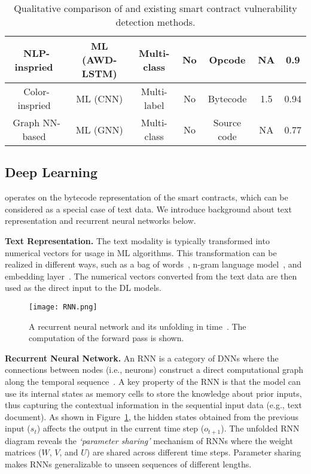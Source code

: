 \begin{table*}
{\begin{tabular}{|c|c|c|c|c|c|c|}
\hline
NLP-inspried~\cite{gogineni2020multi} & ML (AWD-LSTM) & Multi-class & No & Opcode & NA & 0.9 \\ 
\hline
Color-inspried~\cite{huang2018hunting} & ML (CNN) & Multi-label & No & Bytecode & 1.5 & 0.94 \\ 
\hline
Graph NN-based~\cite{zhuangsmart} & ML (GNN) & Multi-class & No & Source code & NA & 0.77 \\
\hline
\end{tabular}
}
\vspace{0.3em}
\caption{Qualitative comparison of \sys{} and existing smart contract vulnerability detection methods. \label{tab:comparison}}
\vspace{-1em}
\end{table*}

\vspace{-0.3em}
\subsection{Deep Learning}
\label{sec:dl}
\vspace{-0.2em}
\sys{} operates on the bytecode representation of the smart contracts, which can be considered as a special case of text data. 
We introduce background about text representation and recurrent neural networks below.

\vspace{0.1em}
\textbf{Text Representation.} 
The text modality is typically transformed into numerical vectors for usage in 
ML algorithms. 
This transformation can be realized in different ways, such as a bag of words~\cite{wallach2006topic}, n-gram language model~\cite{brown1992class}, and embedding layer~\cite{zamani2017relevance}.
The numerical vectors converted from the text data are then used as the direct input to the DL models. 

\setlength{\belowcaptionskip}{-10pt}
\begin{figure}[t!]
  \centering
  \texttt{[image: RNN.png]}
   \vspace{-0.7em}
  \caption{A recurrent neural network and its unfolding in time~\cite{deep-learning-background-03}. The computation of the forward pass is shown.}
  \label{fig:rnn}
  \vspace{-0.3em}
\end{figure}
\vspace{0.1em}
\textbf{Recurrent Neural Network.}
An RNN is a category of DNNs where the connections between nodes (i.e., neurons) construct a direct computational graph along the temporal sequence~\cite{kim2017residual}. 
A key property of the RNN is that the model can use its internal states as memory cells to store the knowledge about prior inputs, thus capturing the contextual information in the sequential input data (e.g., text document).  
As shown in Figure~\ref{fig:rnn}, the hidden states obtained from the previous input ($s_t$) affects the output in the current time step ($o_{t+1}$). The unfolded RNN diagram reveals the \textit{`parameter sharing'} mechanism of RNNs where the weight matrices ($W$, $V$, and $U$) are shared across different time steps. Parameter sharing makes RNNs generalizable to unseen sequences of different lengths.   

